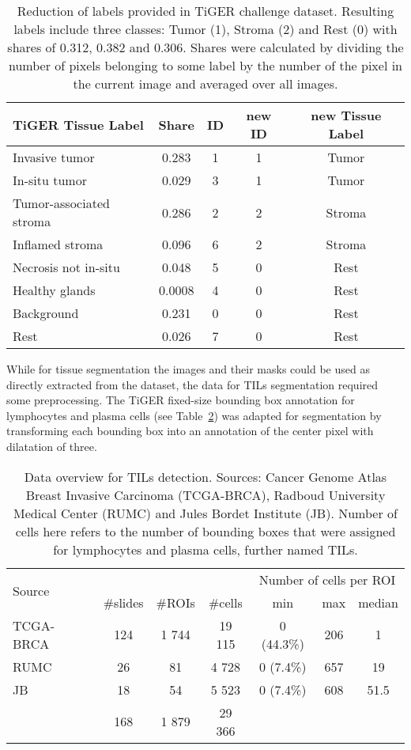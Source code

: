 \begin{table}[h!]
\centering
\begin{tabular}{ l c c c c } 
\hline
TiGER Tissue Label & Share & ID & new ID & new Tissue Label \\ 
\hline
Invasive tumor & 0.283 & 1 & 1 & Tumor\\ 
In-situ tumor & 0.029 & 3 & 1 & Tumor\\ 
Tumor-associated stroma & 0.286 & 2 & 2 & Stroma\\
Inflamed stroma & 0.096 & 6 & 2 & Stroma\\
Necrosis not in-situ & 0.048 & 5 & 0 & Rest\\
Healthy glands & 0.0008 & 4 & 0 & Rest\\ 
Background & 0.231 & 0 & 0 & Rest\\ 
Rest & 0.026 & 7 & 0 & Rest\\
\hline
\end{tabular}
\caption{\label{tab:label_data} Reduction of labels provided in TiGER challenge dataset. Resulting labels include three classes: Tumor (1), Stroma (2) and Rest (0) with shares of 0.312, 0.382 and 0.306. Shares were calculated by dividing
the number of pixels belonging to some label by the number of the pixel in the current image and averaged over all images. }
\end{table}

While for tissue segmentation the images and their masks could be used as directly extracted from the 
dataset, the data for TILs segmentation required some preprocessing. The TiGER fixed-size bounding box
annotation for lymphocytes and plasma cells (see Table~\ref*{tab:tils_data}) was adapted for segmentation by transforming each
bounding box into an annotation of the center pixel with dilatation of three.
\begin{table}[h!]
\centering
\begin{tabular}{ l c c c c c c } 
\hline
\multirow{2}{*}{Source} & & & & \multicolumn{3}{c}{Number of cells per ROI}\\ 
\cline{2-7}
 & \#slides & \#ROIs & \#cells & min & max & median \\ 
\hline
TCGA-BRCA & 124 & 1 744 & 19 115 & 0 (44.3\%) & 206 & 1\\ 
RUMC & 26 & 81 & 4 728 & 0 (7.4\%) & 657 & 19\\ 
JB & 18 & 54 & 5 523 & 0 (7.4\%) & 608 & 51.5\\
\hline
 & 168 & 1 879 & 29 366 & & &\\
\end{tabular}
\caption{\label{tab:tils_data} Data overview for TILs detection. Sources: Cancer Genome Atlas Breast Invasive Carcinoma (TCGA-BRCA),
Radboud University Medical Center (RUMC) and Jules Bordet Institute (JB). Number of cells here refers to the number of
bounding boxes that were assigned for lymphocytes and plasma cells, further named TILs.}
\end{table}

